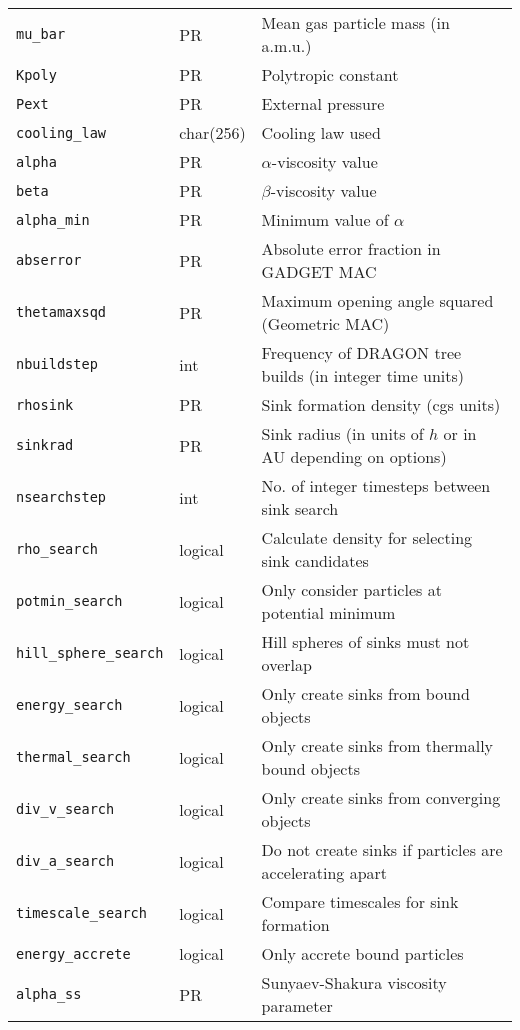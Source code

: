 \documentclass[a4paper]{article}
\newcommand{\var}[1]{\texttt{#1}}
\begin{document}
\begin{center}
\begin{supertabular}{|p{3cm}|p{2cm}|p{8cm}|}
\var{mu\_bar}    & PR       & Mean gas particle mass (in a.m.u.) \\
\var{Kpoly}      & PR       & Polytropic constant \\ 
\var{Pext}       & PR       & External pressure \\ \hline
\var{cooling\_law} & char(256) & Cooling law used \\ \hline
\var{alpha}      & PR       & $\alpha$-viscosity value \\
\var{beta}       & PR       & $\beta$-viscosity value \\
\var{alpha\_min} & PR       & Minimum value of $\alpha$ \\ \hline
\var{abserror}   & PR       & Absolute error fraction in GADGET MAC \\ 
\var{thetamaxsqd}& PR       & Maximum opening angle squared (Geometric MAC) \\
\var{nbuildstep} & int      & Frequency of DRAGON tree builds (in integer time units) \\ \hline
\var{rhosink}    & PR       & Sink formation density (cgs units) \\
\var{sinkrad}    & PR       & Sink radius (in units of $h$ or in AU depending on options) \\
\var{nsearchstep} & int     & No. of integer timesteps between sink search \\
\var{rho\_search} & logical & Calculate density for selecting sink candidates \\
\var{potmin\_search} & logical & Only consider particles at potential minimum \\
\var{hill\_sphere\_search} & logical & Hill spheres of sinks must not overlap \\
\var{energy\_search}  & logical & Only create sinks from bound objects \\
\var{thermal\_search}  & logical & Only create sinks from thermally bound objects \\
\var{div\_v\_search}  & logical & Only create sinks from converging objects \\
\var{div\_a\_search}  & logical & Do not create sinks if particles are accelerating apart \\
\var{timescale\_search} & logical & Compare timescales for sink formation \\ \hline
\var{energy\_accrete} & logical & Only accrete bound particles \\
\var{alpha\_ss}       & PR       & Sunyaev-Shakura viscosity parameter \\

\end{supertabular}
\end{center}
\end{document}

